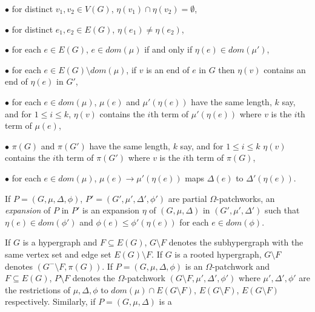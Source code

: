 \hspace*{12pt}$\bullet$ for distinct $v_1, v_2 \in V(G)$, $\eta(v_1) \cap \eta(v_2) = \emptyset$,

\hspace*{12pt}$\bullet$ for distinct $e_1, e_2 \in E(G)$, $\eta(e_1) \ne \eta(e_2)$,

\hspace*{12pt}$\bullet$ for each $e \in E(G)$, $e \in dom(\mu)$ if and only if $\eta(e) \in dom(\mu')$,

\hspace*{12pt}$\bullet$ for each $e \in E(G) \setminus dom(\mu)$, if $v$ is an end of $e$ in $G$ then $\eta(v)$ contains an end of $\eta(e)$ in $G'$,

\hspace*{12pt}$\bullet$ for each $e \in dom(\mu)$, $\mu(e)$ and $\mu'(\eta(e))$ have the same length, $k$ say, and for $1 \le i \le k$, $\eta(v)$ contains the $i$th term of $\mu'(\eta(e))$ where $v$ is the $i$th term of $\mu(e)$,

\hspace*{12pt}$\bullet$ $\pi(G)$ and $\pi(G')$ have the same length, $k$ say, and for $1 \le i \le k$ $\eta(v)$ contains the $i$th term of $\pi(G')$ where $v$ is the $i$th term of $\pi(G)$,

\hspace*{12pt}$\bullet$ for each $e \in dom(\mu)$, $\mu(e) \to \mu'(\eta(e))$ maps $\Delta(e)$ to $\Delta'(\eta(e))$.

If $P = (G, \mu, \Delta, \phi)$, $P' = (G', \mu', \Delta', \phi')$ are partial $\Omega$-patchworks, an \textit{expansion} of $P$ in $P'$ is an expansion $\eta$ of $(G, \mu, \Delta)$ in $(G', \mu', \Delta')$ such that $\eta(e) \in dom(\phi')$ and $\phi(e) \le \phi'(\eta(e))$ for each $e \in dom(\phi)$.

If $G$ is a hypergraph and $F \subseteq E(G)$, $G \setminus F$ denotes the subhypergraph with the same vertex set and edge set $E(G) \setminus F$. If $G$ is a rooted hypergraph, $G \setminus F$ denotes $(G^- \setminus F, \pi(G))$. If $P = (G, \mu, \Delta, \phi)$ is an $\Omega$-patchwork and $F \subseteq E(G)$, $P \setminus F$ denotes the $\Omega$-patchwork $(G \setminus F, \mu', \Delta', \phi')$ where $\mu', \Delta', \phi'$ are the restrictions of $\mu, \Delta, \phi$ to $dom(\mu) \cap E(G \setminus F)$, $E(G \setminus F)$, $E(G \setminus F)$ respectively. Similarly, if $P = (G, \mu, \Delta)$ is a
